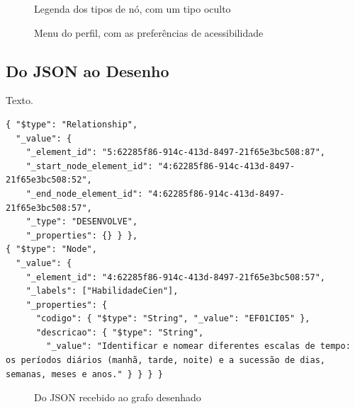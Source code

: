\begin{figure}[H]
    \centering
    \caption{Legenda dos tipos de nó, com um tipo oculto}
    \label{fig-grafos-legenda}
\end{figure}

\begin{figure}[H]
    \centering
    \caption{Menu do perfil, com as preferências de acessibilidade}
    \label{fig-grafos-perfil}
\end{figure}


\subsection{Do JSON ao Desenho}
\label{sec-edugraph-grafos-json}

Texto.

\begin{lstlisting}[caption={Trecho da resposta em JSON tipado recebida pelo site},label={lst-json}]
{ "$type": "Relationship",
  "_value": {
    "_element_id": "5:62285f86-914c-413d-8497-21f65e3bc508:87",
    "_start_node_element_id": "4:62285f86-914c-413d-8497-21f65e3bc508:52",
    "_end_node_element_id": "4:62285f86-914c-413d-8497-21f65e3bc508:57",
    "_type": "DESENVOLVE",
    "_properties": {} } },
{ "$type": "Node",
  "_value": {
    "_element_id": "4:62285f86-914c-413d-8497-21f65e3bc508:57",
    "_labels": ["HabilidadeCien"],
    "_properties": {
      "codigo": { "$type": "String", "_value": "EF01CI05" },
      "descricao": { "$type": "String",
        "_value": "Identificar e nomear diferentes escalas de tempo: os períodos diários (manhã, tarde, noite) e a sucessão de dias, semanas, meses e anos." } } } }
\end{lstlisting}

\begin{figure}[H]
    \centering
    \caption{Do JSON recebido ao grafo desenhado}
    \label{fig-pipeline-canvas}
    \marcadorbrasao
\end{figure}


